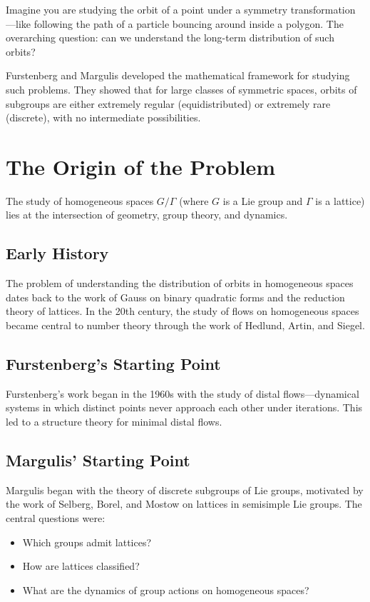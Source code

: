 Imagine you are studying the orbit of a point under a symmetry transformation---like following the path of a particle bouncing around inside a polygon. The overarching question: can we understand the long-term distribution of such orbits?

Furstenberg and Margulis developed the mathematical framework for studying such problems. They showed that for large classes of symmetric spaces, orbits of subgroups are either extremely regular (equidistributed) or extremely rare (discrete), with no intermediate possibilities.

\section{The Origin of the Problem}

The study of homogeneous spaces $G/\Gamma$ (where $G$ is a Lie group and $\Gamma$ is a lattice) lies at the intersection of geometry, group theory, and dynamics.

\subsection{Early History}

The problem of understanding the distribution of orbits in homogeneous spaces dates back to the work of Gauss on binary quadratic forms and the reduction theory of lattices. In the 20th century, the study of flows on homogeneous spaces became central to number theory through the work of Hedlund, Artin, and Siegel.

\subsection{Furstenberg's Starting Point}

Furstenberg's work began in the 1960s with the study of distal flows---dynamical systems in which distinct points never approach each other under iterations. This led to a structure theory for minimal distal flows.

\subsection{Margulis' Starting Point}

Margulis began with the theory of discrete subgroups of Lie groups, motivated by the work of Selberg, Borel, and Mostow on lattices in semisimple Lie groups. The central questions were:
\begin{itemize}
\item Which groups admit lattices?
\item How are lattices classified?
\item What are the dynamics of group actions on homogeneous spaces?
\end{itemize}

